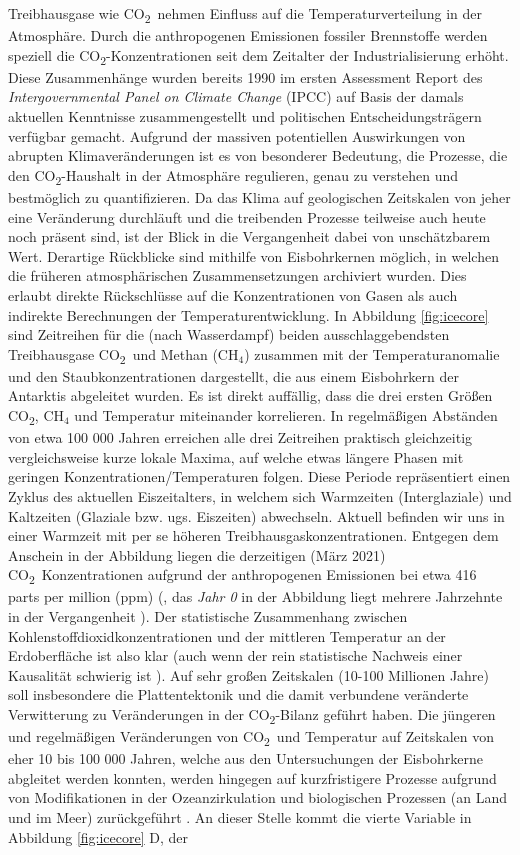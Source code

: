 \documentclass[12pt,a4paper,onecolumn,headheight=30pt]{scrartcl}
\newcommand{\cotwo}{CO\textsubscript{2}}
\begin{document}
\sloppy %
Treibhausgase wie \cotwo \ nehmen Einfluss auf die Temperaturverteilung in der Atmosphäre. Durch die anthropogenen Emissionen fossiler Brennstoffe werden speziell die \cotwo -Konzentrationen seit dem Zeitalter der Industrialisierung erhöht. Diese Zusammenhänge wurden bereits 1990 im ersten Assessment Report des \textit{Intergovernmental Panel on Climate Change} (IPCC) auf Basis der damals aktuellen Kenntnisse zusammengestellt und politischen Entscheidungsträgern verfügbar gemacht. Aufgrund der massiven potentiellen Auswirkungen von abrupten Klimaveränderungen \citep{IPCCpol.2018} ist es von besonderer Bedeutung, die Prozesse, die den \cotwo -Haushalt in der Atmosphäre regulieren, genau zu verstehen und bestmöglich zu quantifizieren. Da das Klima auf geologischen Zeitskalen von jeher eine Veränderung durchläuft und die treibenden Prozesse teilweise auch heute noch präsent sind, ist der Blick in die Vergangenheit dabei von unschätzbarem Wert. Derartige Rückblicke sind mithilfe von Eisbohrkernen möglich, in welchen die früheren atmosphärischen Zusammensetzungen archiviert wurden. Dies erlaubt direkte Rückschlüsse auf die Konzentrationen von Gasen als auch indirekte Berechnungen der Temperaturentwicklung. In Abbildung \ref{fig:icecore} sind  Zeitreihen für die (nach Wasserdampf) beiden ausschlaggebendsten Treibhausgase \cotwo \ und Methan (CH$_4$) zusammen mit der Temperaturanomalie und den Staubkonzentrationen dargestellt, die aus einem Eisbohrkern der Antarktis abgeleitet wurden. Es ist direkt auffällig, dass die drei ersten Größen \cotwo , CH$_4$ und Temperatur miteinander korrelieren. In regelmäßigen Abständen von etwa 100 000 Jahren erreichen alle drei Zeitreihen praktisch gleichzeitig vergleichsweise kurze lokale Maxima, auf welche etwas längere Phasen mit geringen Konzentrationen/Temperaturen folgen. Diese Periode repräsentiert einen Zyklus des aktuellen Eiszeitalters, in welchem sich Warmzeiten (Interglaziale) und Kaltzeiten (Glaziale bzw. ugs. Eiszeiten) abwechseln. Aktuell befinden wir uns in einer Warmzeit mit per se höheren Treibhausgaskonzentrationen. Entgegen dem Anschein in der Abbildung liegen die derzeitigen (März 2021) \cotwo \ Konzentrationen aufgrund der anthropogenen Emissionen bei etwa 416 parts per million (ppm) (\cite{NASA.06.05.2021}, das \textit{Jahr 0} in der Abbildung liegt mehrere Jahrzehnte in der Vergangenheit \citep{Luthi.2008}). Der statistische Zusammenhang zwischen Kohlenstoffdioxidkonzentrationen und der mittleren Temperatur an der Erdoberfläche ist also klar (auch wenn der rein statistische Nachweis einer Kausalität schwierig ist \citep{Stips.2016}). Auf sehr großen Zeitskalen (10-100 Millionen Jahre) soll insbesondere die Plattentektonik und die damit verbundene veränderte Verwitterung zu Veränderungen in der \cotwo -Bilanz geführt haben. Die jüngeren und regelmäßigen Veränderungen von \cotwo \ und Temperatur auf Zeitskalen von eher 10 bis 100 000 Jahren, welche aus den Untersuchungen der Eisbohrkerne abgleitet werden konnten, werden hingegen auf kurzfristigere Prozesse aufgrund von Modifikationen in der Ozeanzirkulation und biologischen Prozessen (an Land und im Meer) zurückgeführt \citep{Emerson.2009}. An dieser Stelle kommt die vierte Variable in Abbildung \ref{fig:icecore} D, der 
\end{document}
